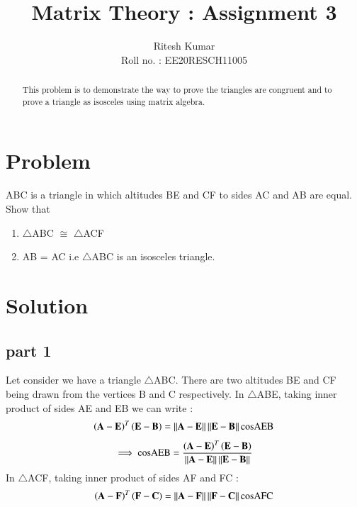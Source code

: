\documentclass[journal,12pt,twocolumn]{IEEEtran}
\begin{document}
     \def\rightbox#1{\makebox[0in][r]{#1}}
     \def\centbox#1{\makebox[0in]{#1}}
     \def\topbox#1{\raisebox{-\baselineskip}[0in][0in]{#1}}
     \def\midbox#1{\raisebox{-0.5\baselineskip}[0in][0in]{#1}}
\vspace{3cm}
\title{ Matrix Theory : Assignment 3 }
\author{Ritesh Kumar \\ Roll no. : EE20RESCH11005 }
\maketitle
\newpage
\bigskip
\renewcommand{\thefigure}{\theenumi}
\renewcommand{\thetable}{\theenumi}
\begin{abstract}
This problem is to demonstrate the way to prove the triangles are congruent and to prove a triangle as isosceles using matrix algebra.
\end{abstract}

\section{Problem}
ABC is a triangle in which altitudes BE and CF to sides AC and AB are equal. Show that 
\begin{enumerate}
	\item $\triangle$ABC $\cong$ $\triangle$ACF 
	\item AB = AC  i.e $\triangle$ABC is an isosceles triangle.
\end{enumerate}
\section{Solution}
\subsection{part 1}
Let consider we have a triangle $\triangle$ABC. There are two altitudes BE and CF being  drawn from the vertices B and C respectively. \newline
 In $\triangle$ABE, taking inner product of sides  AE and EB we can write :
\begin{align}
\left( \mathbf{A-E} \right)^T \left( \mathbf{E - B} \right) = \left\lVert\mathbf{A - E}\right\rVert \left\lVert\mathbf{ E - B}\right\rVert \text{cosAEB}
\end{align}
\begin{align}
\implies \text{cosAEB} = \frac{\left( \mathbf{A-E} \right)^T  \left( \mathbf{E - B } \right)}{\left\lVert\mathbf{A - E}\right\rVert \left\lVert\mathbf{E - B}\right\rVert}
\end{align}
In $\triangle$ACF, taking inner product of sides AF and FC :
\begin{align}
\left( \mathbf{A-F} \right)^T \left( \mathbf{F - C} \right) = \left\lVert\mathbf{A - F}\right\rVert \left\lVert\mathbf{ F - C}\right\rVert \text{cosAFC}
\end{align}
\end{document}
